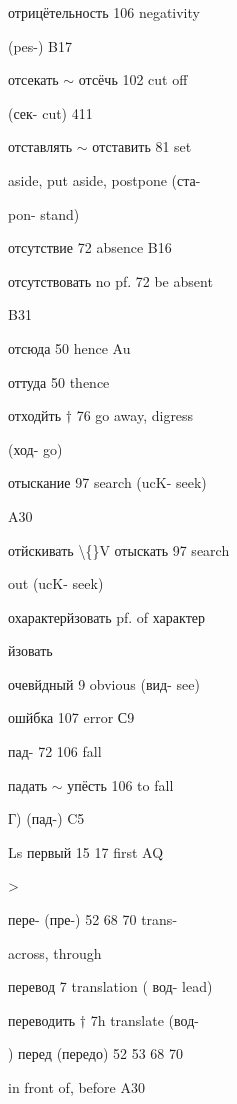 \begin{minipage}[t]{0.475\textwidth}
\raggedright
\noindent отрицётельность 106 negativity\par
\noindent (pes-) B17\par
\noindent отсекать $\sim$ отсёчь 102 cut off\par
\noindent (сек- cut) 411\par
\noindent отставлять $\sim$ отставить 81 set\par
\noindent aside, put aside, postpone (ста-\par
\noindent pon- stand)\par
\noindent отсутствие 72 absence B16\par
\noindent отсутствовать no pf. 72 be absent\par
\noindent B31\par
\noindent отсюда 50 hence Au\par
\noindent оттуда 50 thence\par
\noindent отходйть $\dagger$ 76 go away, digress\par
\noindent (ход- go)\par
\noindent отыскание 97 search (ucK- seek)\par
\noindent A30\par
\noindent отйскивать \textbackslash\{\}V отыскать 97 search\par
\noindent out (ucK- seek)\par
\noindent охарактерйзовать pf. of характер\par
\noindent йзовать\par
\noindent очевйдный 9 obvious (вид- see)\par
\noindent ошйбка 107 error С9\par
\noindent пад- 72 106 fall\par
\noindent падать $\sim$ упёсть 106 to fall\par
\noindent Г) (пад-) C5\par
\noindent Ls первый 15 17 first AQ\par
\noindent >\par
\noindent пере- (пре-) 52 68 70 trans-\par
\noindent across, through\par
{} перевод 7 translation ( вод- lead)\par
\noindent переводить $\dagger$ 7h translate (вод-\par
{}) перед (передо) 52 53 68 70\par
\noindent in front of, before A30\par

\end{minipage}

